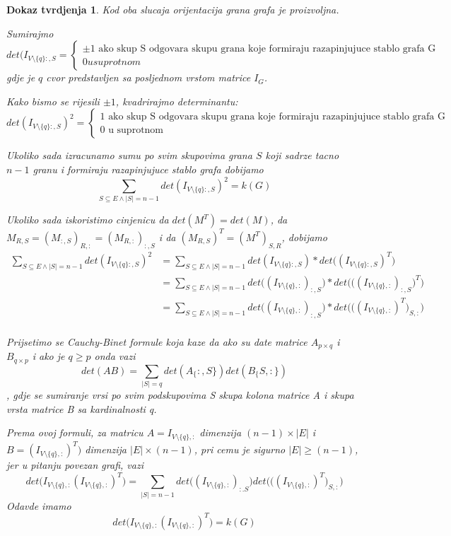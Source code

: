 \documentclass[11pt]{article}
\newtheorem*{custom_proof}{Dokaz tvrdjenja}
\begin{document}
\begin{custom_proof}
		Kod oba slucaja orijentacija grana grafa je proizvoljna.
	
		Sumirajmo
		\[
		 det(I_{V \setminus \{q\}:,S} = 
		\begin{cases}
		\pm 1 \text{ ako skup S odgovara skupu grana koje formiraju razapinjujuce stablo grafa G}\\
		0 u suprotnom
		\end{cases} 
		\]
		gdje je $q$ cvor predstavljen sa posljednom vrstom matrice $I_G$.
	
		Kako bismo se rijesili $\pm 1$, kvadrirajmo determinantu:
		\[
		 det(I_{V \setminus \{q\}:,S})^2 = 
		\begin{cases}
		1 \text{ ako skup S odgovara skupu grana koje formiraju razapinjujuce stablo grafa G}\\
		0 \text{ u suprotnom}
		\end{cases} 
		\]
	
		Ukoliko sada izracunamo sumu po svim skupovima grana $S$ koji sadrze tacno $n-1$ granu i formiraju razapinjujuce stablo grafa dobijamo
		\[
		\sum_{S \subseteq E \land |S| = n -1}   det(I_{V \setminus \{q\}:,S})^2 = k(G)
		\]
	
		Ukoliko sada iskoristimo cinjenicu da $det(M^T) = det(M)$, da $M_{R,S} = (M_{:,S})_{R,:} = (M_{R,:})_{:,S}$ i da $(M_{R,S})^T =(M^T)_{S,R}$, dobijamo
		\[
		\begin{split}
		\sum_{S \subseteq E \land |S| = n -1}   det(I_{V \setminus \{q\}:,S})^2  & =
		\sum_{S \subseteq E \land |S| = n -1}   det(I_{V \setminus \{q\}:,S}) * det\big((I_{V \setminus \{q\}:,S})^T\big) \\
		&  = \sum_{S \subseteq E \land |S| = n -1}   det\big((I_{V \setminus \{q\},:})_{:,S}\big) * det\Big(\big((I_{V \setminus \{q\},:})_{:,S}\big)^T\Big)\\
		&  = \sum_{S \subseteq E \land |S| = n -1}   det\big((I_{V \setminus \{q\},:})_{:,S}\big) * det\Big(\big((I_{V \setminus \{q\},:})^T\big)_{S,:}\Big)\\
		\end{split}
		\]
	
		Prijsetimo se Cauchy-Binet formule koja kaze da ako su date matrice $A_{p \times q}$ i $B_{q \times p}$ i ako je $q \geq p$ onda vazi
		\[
			det(AB) = \sum_{|S| = q} det(A_\{:,S\}) det(B_\{S,:\})
		\], gdje se sumiranje vrsi po svim podskupovima S skupa kolona matrice A i skupa vrsta matrice B sa kardinalnosti q.
		
		Prema ovoj formuli, za matricu $A = I_{V \setminus \{q\},:}$ dimenzija $(n - 1) \times |E|$ i $B = (I_{V \setminus \{q\},:})^T\big)$ dimenzija $|E| \times (n - 1)$, pri cemu je sigurno $|E| \geq (n-1)$, jer u pitanju
		povezan grafi, vazi
		\[
		det \big(I_{V \setminus \{q\},:} (I_{V \setminus \{q\},:})^T\big) = \sum_{|S| = n - 1} det\big((I_{V \setminus \{q\},:})_{:.S}\big) det\Big(\big((I_{V \setminus \{q\},:})^T\big)_{S,:}\Big)
		\] 
		Odavde imamo
		\[
		det \big(I_{V \setminus \{q\},:} (I_{V \setminus \{q\},:})^T\big) = k(G)
		\] 
		\end{custom_proof}
	
\end{document}
